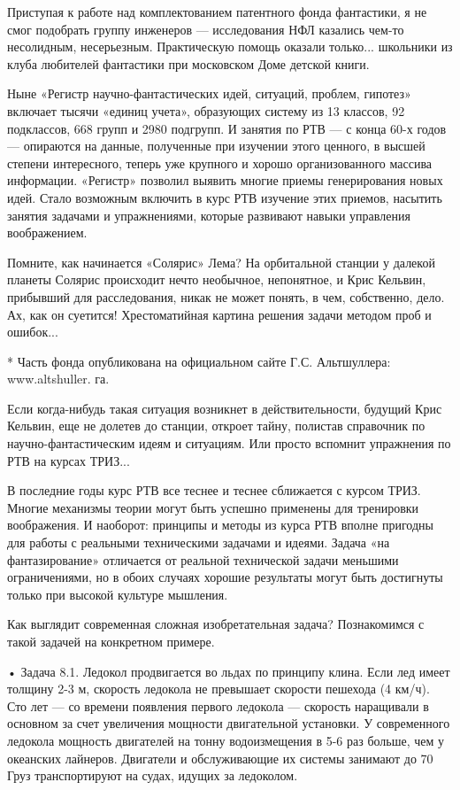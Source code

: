 Приступая к работе над  комплектованием патентного фонда фантастики, я
не  смог  подобрать  группу  инженеров  —  исследования  НФЛ  казались
чем-то несолидным, несерьезным.  Практическую помощь оказали только...
школьники из  клуба любителей  фантастики при московском  Доме детской
книги.

Ныне «Регистр научно-фантастических  идей, ситуаций, проблем, гипотез»
включает тысячи «единиц  учета», образующих систему из  13 классов, 92
подклассов, 668  групп и  2980 подгрупп.  И занятия по  РТВ —  с конца
60-х  годов  — опираются  на  данные,  полученные при  изучении  этого
ценного, в  высшей степени интересного,  теперь уже крупного  и хорошо
организованного массива информации.  «Регистр» позволил выявить многие
приемы генерирования новых  идей. Стало возможным включить  в курс РТВ
изучение  этих  приемов,  насытить занятия  задачами  и  упражнениями,
которые развивают навыки управления воображением.

Помните,  как  начинается «Солярис»  Лема?  На  орбитальной станции  у
далекой планеты Солярис происходит нечто необычное, непонятное, и Крис
Кельвин, прибывший  для расследования, никак  не может понять,  в чем,
собственно, дело. Ах, как  он суетится! Хрестоматийная картина решения
задачи методом проб и ошибок...

*  Часть фонда  опубликована  на официальном  сайте Г.С.  Альтшуллера:
www.altshuller. га.


Если когда-нибудь такая ситуация возникнет в действительности, будущий
Крис  Кельвин, еще  не  долетев до  станции,  откроет тайну,  полистав
справочник  по научно-фантастическим  идеям  и  ситуациям. Или  просто
вспомнит упражнения по РТВ на курсах ТРИЗ...

В последние  годы курс  РТВ все  теснее и  теснее сближается  с курсом
ТРИЗ.  Многие  механизмы  теории  могут  быть  успешно  применены  для
тренировки воображения.  И наоборот:  принципы и  методы из  курса РТВ
вполне пригодны для работы с реальными техническими задачами и идеями.
Задача «на  фантазирование» отличается от реальной  технической задачи
меньшими ограничениями,  но в  обоих случаях хорошие  результаты могут
быть достигнуты только при высокой культуре мышления.




Как выглядит современная  сложная изобретательная задача? Познакомимся
с такой задачей на конкретном примере.

•  Задача  8.1.  Ледокол  продвигается во  льдах  по  принципу  клина.
Если  лед  имеет  толщину  2-3   м,  скорость  ледокола  не  превышает
скорости пешехода  (4 км/ч).  Сто лет —  со времени  появления первого
ледокола — скорость наращивали в  основном за счет увеличения мощности
двигательной установки. У современного ледокола мощность двигателей на
тонну  водоизмещения  в 5-6  раз  больше,  чем у  океанских  лайнеров.
Двигатели и  обслуживающие их системы  занимают до 70%
Груз транспортируют на судах, идущих за ледоколом.

